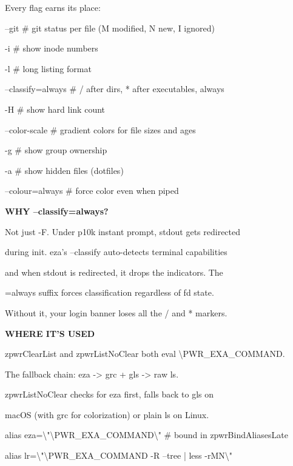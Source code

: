 \documentclass[11pt,a4paper,twoside]{book}
\begin{document}
Every flag earns its place:

--git              \# git status per file (M modified, N new, I ignored)

-i                 \# show inode numbers

-l                 \# long listing format

--classify=always  \# / after dirs, * after executables, always

-H                 \# show hard link count

--color-scale      \# gradient colors for file sizes and ages

-g                 \# show group ownership

-a                 \# show hidden files (dotfiles)

--colour=always    \# force color even when piped


\vspace{12pt}
{\bfseries\color{neonyellow} WHY --classify=always?}\vspace{4pt}

Not just -F. Under p10k instant prompt, stdout gets redirected

during init. eza's --classify auto-detects terminal capabilities

and when stdout is redirected, it drops the indicators. The

=always suffix forces classification regardless of fd state.

Without it, your login banner loses all the / and * markers.


\vspace{12pt}
{\bfseries\color{neonyellow} WHERE IT'S USED}\vspace{4pt}

zpwrClearList and zpwrListNoClear both eval \textbackslash{}PWR\_EXA\_COMMAND.

The fallback chain: eza -> grc + gls -> raw ls.

zpwrListNoClear checks for eza first, falls back to gls on

macOS (with grc for colorization) or plain ls on Linux.

\begin{codebox}
alias eza=\textbackslash{}"\textbackslash{}PWR\_EXA\_COMMAND\textbackslash{}"  \# bound in zpwrBindAliasesLate\\
\end{codebox}

alias lr=\textbackslash{}"\textbackslash{}PWR\_EXA\_COMMAND -R --tree | less -rMN\textbackslash{}"
\end{document}

